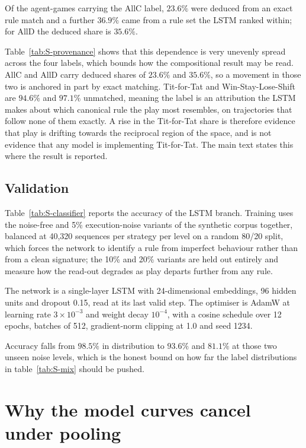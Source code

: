 \documentclass[11pt,a4paper]{article}
\begin{document}
Of the agent-games carrying the AllC label, $23.6\%$ were deduced from an exact
rule match and a further $36.9\%$ came from a rule set the LSTM ranked within;
for AllD the deduced share is $35.6\%$.

Table~\ref{tab:S-provenance} shows that this dependence is very unevenly spread
across the four labels, which bounds how the compositional result may be read.
AllC and AllD carry deduced shares of $23.6\%$ and $35.6\%$, so a movement in
those two is anchored in part by exact matching. Tit-for-Tat and
Win-Stay-Lose-Shift are $94.6\%$ and $97.1\%$ unmatched, meaning the label is an
attribution the LSTM makes about which canonical rule the play most resembles,
on trajectories that follow none of them exactly. A rise in the Tit-for-Tat
share is therefore evidence that play is drifting towards the reciprocal region
of the space, and is not evidence that any model is implementing Tit-for-Tat.
The main text states this where the result is reported.

\subsection{Validation}

Table~\ref{tab:S-classifier} reports the accuracy of the LSTM branch. Training
uses the noise-free and 5\% execution-noise variants of the synthetic corpus
together, balanced at 40{,}320 sequences per strategy per level on a random
80/20 split, which forces the network to identify a rule from imperfect
behaviour rather than from a clean signature; the 10\% and 20\% variants are
held out entirely and measure how the read-out degrades as play departs further
from any rule.

The network is a single-layer LSTM with 24-dimensional embeddings, 96 hidden
units and dropout 0.15, read at its last valid step.
The optimiser is AdamW at learning rate $3\times10^{-3}$ and weight decay
$10^{-4}$, with a cosine schedule over 12 epochs, batches of 512,
gradient-norm clipping at 1.0 and seed 1234.

Accuracy falls from $98.5\%$ in distribution to $93.6\%$ and $81.1\%$ at those
two unseen noise levels, which is the honest bound on how far the label
distributions in table~\ref{tab:S-mix} should be pushed.

\section{Why the model curves cancel under pooling}
\end{document}
